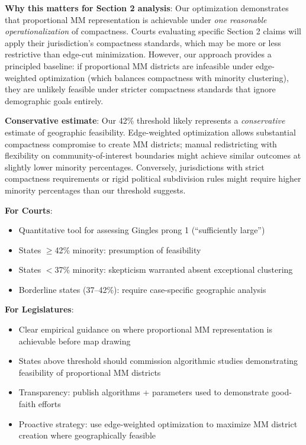 \textbf{Why this matters for Section 2 analysis}: Our optimization demonstrates that proportional MM representation is achievable under \emph{one reasonable operationalization} of compactness. Courts evaluating specific Section 2 claims will apply their jurisdiction's compactness standards, which may be more or less restrictive than edge-cut minimization. However, our approach provides a principled baseline: if proportional MM districts are infeasible under edge-weighted optimization (which balances compactness with minority clustering), they are unlikely feasible under stricter compactness standards that ignore demographic goals entirely.

\textbf{Conservative estimate}: Our 42\% threshold likely represents a \emph{conservative} estimate of geographic feasibility. Edge-weighted optimization allows substantial compactness compromise to create MM districts; manual redistricting with flexibility on community-of-interest boundaries might achieve similar outcomes at slightly lower minority percentages. Conversely, jurisdictions with strict compactness requirements or rigid political subdivision rules might require higher minority percentages than our threshold suggests.

\textbf{For Courts}:
\begin{itemize}
    \item Quantitative tool for assessing Gingles prong 1 (``sufficiently large'')
    \item States $\geq$42\% minority: presumption of feasibility
    \item States $<$37\% minority: skepticism warranted absent exceptional clustering
    \item Borderline states (37--42\%): require case-specific geographic analysis
\end{itemize}

\textbf{For Legislatures}:
\begin{itemize}
    \item Clear empirical guidance on where proportional MM representation is achievable before map drawing
    \item States above threshold should commission algorithmic studies demonstrating feasibility of proportional MM districts
    \item Transparency: publish algorithms + parameters used to demonstrate good-faith efforts
    \item Proactive strategy: use edge-weighted optimization to maximize MM district creation where geographically feasible
\end{itemize}

